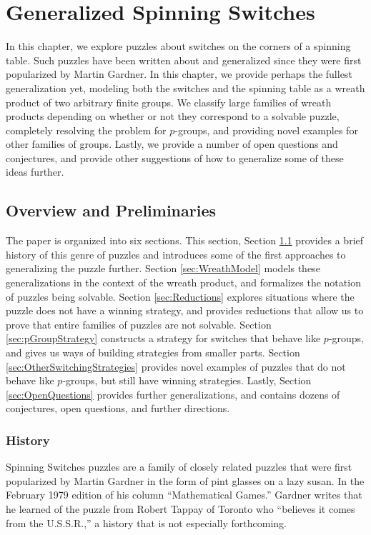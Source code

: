 \chapter{Generalized Spinning Switches}
\label{cha:research_topic_1}

In this chapter, we explore puzzles about switches on the corners of a
spinning table. Such puzzles have been written about and generalized since they
were first popularized by Martin Gardner.
In this chapter, we provide perhaps the fullest generalization yet, modeling
both the switches and the spinning table as a wreath product of two arbitrary
finite groups. We classify large families of wreath products depending on
whether or not they correspond to a solvable puzzle, completely resolving the
problem for $p$-groups, and providing novel examples for other families of
groups. Lastly, we provide a number of open questions and conjectures, and
provide other suggestions of how to generalize some of these ideas further.

\section{Overview and Preliminaries}
\label{sec:overviewAndPreliminaries}
The paper is organized into six sections.
This section,
Section \ref{sec:overviewAndPreliminaries} provides a brief history of this genre of puzzles and introduces some of the first approaches to generalizing the puzzle further.
Section \ref{sec:WreathModel} models these generalizations in the context of the wreath product, and formalizes the notation of puzzles being solvable.
Section \ref{sec:Reductions} explores situations where the puzzle does not have a winning strategy, and provides reductions that allow us to prove that entire families of puzzles are not solvable.
Section \ref{sec:pGroupStrategy} constructs a strategy for switches that behave like $p$-groups, and gives us ways of building strategies from smaller parts.
Section \ref{sec:OtherSwitchingStrategies} provides novel examples of puzzles that do not behave like $p$-groups, but still have winning strategies.
Lastly,
Section \ref{sec:OpenQuestions} provides further generalizations, and contains dozens of conjectures, open questions, and further directions.

\subsection{History}
Spinning Switches puzzles are a family of closely related puzzles
that were first popularized by Martin Gardner in the form of pint glasses
on a lazy susan.
In the February 1979 edition of his column ``Mathematical Games.'' \cite{Gardner1979Problem}
Gardner writes that he learned of the puzzle from Robert Tappay of Toronto who
``believes it comes from the U.S.S.R.,'' a history that is not especially
forthcoming.

